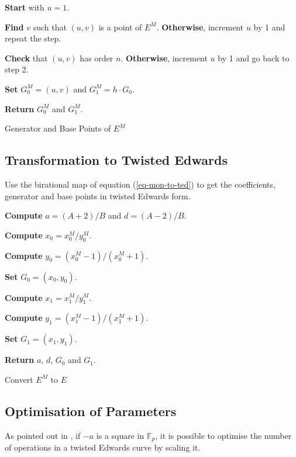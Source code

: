 \documentclass{article}
\newcommand{\Fp}{\ensuremath{\mathbb{F}_p}}
\theoremstyle{definition}
\theoremstyle{remark}
\begin{document}
\begin{spacing}{1.2}
\begin{multicols}{2}
\begin{algorithm}[H]
	
	{\bf Start} with $u = 1$.
	
	{\bf Find} $v$ such that $(u,v)$ is a point of $E^M$. {\bf Otherwise}, increment $u$ by 1 and repeat the step.
	
	{\bf Check} that $(u,v)$ has order $n$. {\bf Otherwise}, increment $u$ by 1 and go back to step 2. 
	
	{\bf Set} $G_0^M = (u,v)$ and $G_1^M = h\cdot G_0$.
	
	{\bf Return} $G_0^M$ and $G_1^M$.

\caption{Generator and Base Points of $E^M$}
\end{algorithm}

\subsection{Transformation to Twisted Edwards}

Use the birational map of equation (\ref{eq-mon-to-ted}) to get the coefficients, generator and base points in twisted Edwards form.
 
\vspace{0.2cm}
\begin{algorithm}[H] %
	\SetAlgoLined


	{\bf Compute} 	$a = (A + 2) / B$ and 
					$d = (A - 2) / B$.
	
	{\bf Compute} $x_0 = x_0^M/y_0^M$.
	
	{\bf Compute} $y_0 = (x_0^M -1) / (x_0^M + 1)$.
					
	{\bf Set} $G_0 = (x_0, y_0)$.
	
	{\bf Compute} $x_1 = x_1^M/y_1^M$.
	
	{\bf Compute} $y_1 = (x_1^M -1) / (x_1^M + 1)$.
	
	{\bf Set} $G_1 = (x_1, y_1)$.
	
	{\bf Return} $a$, $d$, $G_0$ and $G_1$.

\caption{Convert $E^M$ to $E$}
\end{algorithm}

\subsection{Optimisation of Parameters}

As pointed out in \cite[Sec. 3.1]{scaling}, if $-a$ is a square in $\Fp$, it is possible to optimise the number of operations in a twisted Edwards curve by scaling it. 


\end{multicols}
\end{spacing}
\end{document}
